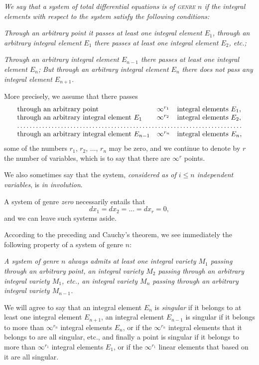 \documentclass[leqno,11pt]{book}
\theoremstyle{shape1}
\theoremstyle{shapesmall}
\begin{document}
\emph{We say that a system of total differential equations is of \textsc{genre} $n$ if the integral elements with respect to the system satisfy the following conditions:}

\emph{Through an arbitrary point it passes at least one integral element $E_{1}$, through an arbitrary integral element $E_{1}$ there passes at least one integral element $E_{2}$, etc.;}

\emph{Through an arbitrary integral element $E_{n-1}$ there passes at least one integral element $E_{n}$;}
\emph{But through an arbitrary  integral element $E_{n}$ there does not pass any integral element $E_{n+1}$.}

More precisely, we assume that there passes
\[
\begin{matrix*}[l]
  \text{through an arbitrary point }&\infty^{r_{1}} &\text{integral elements } E_{1},\\
  \text{through an arbitrary integral element } E_{1}&\infty^{r_{2}}&\text{integral elements }E_{2},\\
  \hdotsfor{3}\\
  \text{through an arbitrary integral element } E_{n-1}&\infty^{r_{n}}&\text{integral elements }E_{n},
\end{matrix*}
\]
some of the numbers $r_{1}$, $r_{2}$, $\dots$, $r_{n}$ may be zero, and we continue to denote by $r$ the number of variables, which is to say that there are $\infty^{r}$ points.

We also sometimes say that the system, \emph{considered as of $i\le n$ independent variables}, is \emph{in involution}.

A system of genre \emph{zero} necessarily entails that
\[
dx_{1}=dx_{2}=\dots=dx_{r}=0,
\]
and we can leave such systems aside.

According to the preceding and Cauchy's theorem, we see immediately the following property of a system of genre $n$:

\emph{A system of genre $n$ always admits at least one integral variety $M_{1}$ passing through an arbitrary point, an integral variety $M_{2}$ passing through an arbitrary integral variety $M_{1}$, etc., an integral variety $M_{n}$ passing through an arbitrary integral variety $M_{n-1}$.}

We will agree to say that an integral element $E_{n}$ is \emph{singular} if it belongs to at least one integral element $E_{n+1}$, an integral element $E_{n-1}$ is singular if it belongs to more than $\infty^{r_{n}}$ integral elements $E_{n}$, or if the $\infty^{r_{n}}$ integral elements that it belongs to are all singular, etc., and finally a point is singular if it belongs to more than $\infty^{r_{1}}$ integral elements $E_{1}$, or if the $\infty^{r_{1}}$ linear elements that based on it are all singular.
\end{document}
